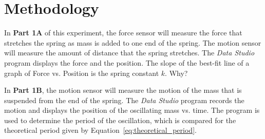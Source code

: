 \documentclass[twocolumn,english]{IEEEtran}
\theoremstyle{plain}
\theoremstyle{plain}
\begin{document}
\section{Methodology}
 In \textbf{Part 1A} of this experiment, the force sensor will measure the force that stretches the spring as mass is added to one end of the spring.
 The motion sensor will measure the amount of distance that the spring stretches.
 The \textit{Data Studio} program displays the force and the position.
 The slope of the best-fit line of a graph of Force vs. Position is the spring constant $k$. Why?

 In \textbf{Part 1B}, the motion sensor will measure the motion of the mass that is suspended from the end of the spring.
 The \textit{Data Studio} program records the motion and displays the position of the oscillating mass vs. time.
 The program is used to determine the period of the oscillation, which is compared for the theoretical period given by Equation~\ref{eq:theoretical_period}.
\end{document}

